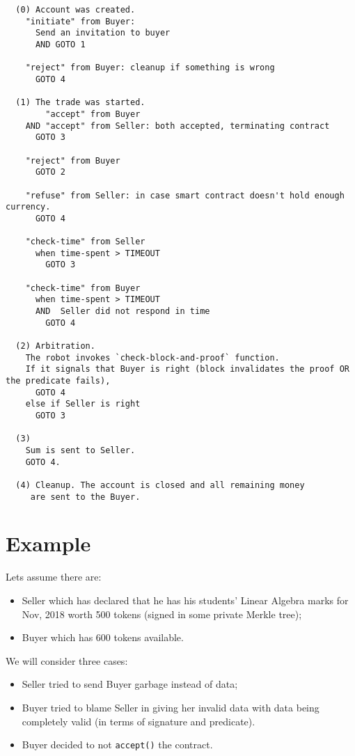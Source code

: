 \documentclass[a4paper]{article}
\begin{document}
\begin{verbatim}
  (0) Account was created.
    "initiate" from Buyer:
      Send an invitation to buyer
      AND GOTO 1

    "reject" from Buyer: cleanup if something is wrong
      GOTO 4

  (1) The trade was started.
        "accept" from Buyer
    AND "accept" from Seller: both accepted, terminating contract
      GOTO 3

    "reject" from Buyer
      GOTO 2

    "refuse" from Seller: in case smart contract doesn't hold enough currency.
      GOTO 4

    "check-time" from Seller
      when time-spent > TIMEOUT
        GOTO 3

    "check-time" from Buyer
      when time-spent > TIMEOUT
      AND  Seller did not respond in time
        GOTO 4

  (2) Arbitration.
    The robot invokes `check-block-and-proof` function.
    If it signals that Buyer is right (block invalidates the proof OR the predicate fails),
      GOTO 4
    else if Seller is right
      GOTO 3

  (3)
    Sum is sent to Seller.
    GOTO 4.

  (4) Cleanup. The account is closed and all remaining money
     are sent to the Buyer.

\end{verbatim}

\section*{Example}

Lets assume there are:
\begin{itemize}
  \item Seller which has declared that he has his students' Linear Algebra marks for Nov, 2018 worth 500 tokens (signed in some private Merkle tree);
  \item Buyer which has 600 tokens available.
\end{itemize}

We will consider three cases:
\begin{itemize}
  \item Seller tried to send Buyer garbage instead of data;
  \item Buyer tried to blame Seller in giving her invalid data with data being completely valid (in terms of signature and predicate).
  \item Buyer decided to not \verb|accept()| the contract.
\end{itemize}
\end{document}
